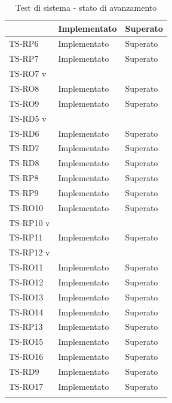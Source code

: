 \begin{longtable}{|>{\centering\arraybackslash}m{1.6cm}|>{\centering\arraybackslash}m{6.41cm}|>{\centering\arraybackslash}m{3.1cm}|}
		& Implementato
		& Superato
		\\ \hline
		\rowcolor{LightGray}
		TS-RP6		
		& Implementato
		& Superato
		\\ \hline
		\rowcolor{white}
		TS-RP7		
		& Implementato
		& Superato
		\\ \hline
		\rowcolor{LightGray}
		TS-RO7		v
		\\ \hline
		\rowcolor{white}
		TS-RO8		
		& Implementato
		& Superato
		\\ \hline
		\rowcolor{LightGray}
		TS-RO9		
		& Implementato
		& Superato
		\\ \hline
		\rowcolor{white}
		TS-RD5		v
		\\ \hline
		\rowcolor{LightGray}
		TS-RD6		
		& Implementato
		& Superato
		\\ \hline
		\rowcolor{white}
		TS-RD7
		& Implementato
		& Superato
		\\ \hline
		\rowcolor{LightGray}
		TS-RD8		
		& Implementato
		& Superato
		\\ \hline 
		\rowcolor{white}
		TS-RP8		
		& Implementato
		& Superato		
		\\ \hline
		\rowcolor{LightGray}
		TS-RP9		
		& Implementato
		& Superato
		\\ \hline
		\rowcolor{white}
		TS-RO10
		& Implementato
		& Superato
		\\ \hline
		\rowcolor{LightGray}
		TS-RP10		v
		\\ \hline
		\rowcolor{white}
		TS-RP11		
		& Implementato
		& Superato
		\\ \hline
		\rowcolor{LightGray}
		TS-RP12		v
		\\ \hline	
		
		\rowcolor{white}
		TS-RO11	
		& Implementato
		& Superato
		\\ \hline
		\rowcolor{LightGray}
		TS-RO12	
		& Implementato
		& Superato
		\\ \hline
		\rowcolor{white}
		TS-RO13
		& Implementato
		& Superato
		\\ \hline
		\rowcolor{LightGray}
		TS-RO14
		& Implementato
		& Superato
		\\ \hline
		\rowcolor{white}
		TS-RP13
		& Implementato
		& Superato
		\\ \hline
		\rowcolor{LightGray}
		TS-RO15
		& Implementato
		& Superato
		\\ \hline
		\rowcolor{white}
		TS-RO16	
		& Implementato
		& Superato
		\\ \hline
		\rowcolor{LightGray}
		TS-RD9
		& Implementato
		& Superato
		\\ \hline
		\rowcolor{LightGray}
		TS-RO17
		& Implementato
		& Superato
		\\ \hline
		
		\caption{Test di sistema - stato di avanzamento}
\end{longtable}



